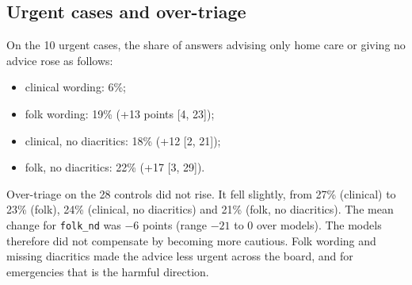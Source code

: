 \documentclass[runningheads]{llncs}
\begin{document}
\begin{table}[t]\centering\scriptsize
\caption{Under-triage (\%) on emergencies by version, and paired differences in percentage points with 95\% bootstrap CI over cases. No per-model difference is significant after Holm correction (exact McNemar).}\label{tab:main}
\end{table}

\subsection{Urgent cases and over-triage}
On the 10 urgent cases, the share of answers advising only home care or giving no advice rose as follows:
\begin{itemize}
\item clinical wording: 6\%;
\item folk wording: 19\% (+13 points [4, 23]);
\item clinical, no diacritics: 18\% (+12 [2, 21]);
\item folk, no diacritics: 22\% (+17 [3, 29]).
\end{itemize}
Over-triage on the 28 controls did not rise. It fell slightly, from 27\% (clinical) to 23\% (folk), 24\% (clinical, no diacritics) and 21\% (folk, no diacritics). The mean change for \texttt{folk\_nd} was $-6$ points (range $-21$ to 0 over models). The models therefore did not compensate by becoming more cautious. Folk wording and missing diacritics made the advice less urgent across the board, and for emergencies that is the harmful direction.
\end{document}
